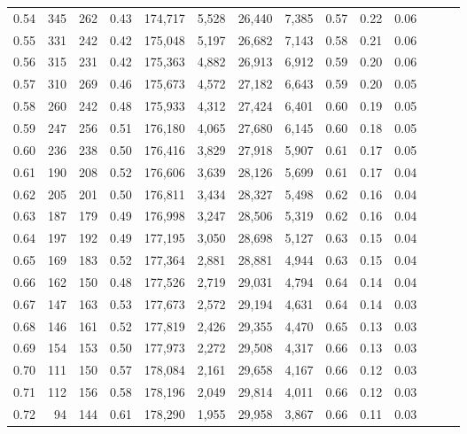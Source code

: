 \begin{tabular}{rrrrrrrrrrrrrr}
0.54 &     345 &  262 &  0.43 &  174,717 &    5,528 &  26,440 &   7,385 &  0.57 &  0.22 &      0.06 \\
0.55 &     331 &  242 &  0.42 &  175,048 &    5,197 &  26,682 &   7,143 &  0.58 &  0.21 &      0.06 \\
0.56 &     315 &  231 &  0.42 &  175,363 &    4,882 &  26,913 &   6,912 &  0.59 &  0.20 &      0.06 \\
0.57 &     310 &  269 &  0.46 &  175,673 &    4,572 &  27,182 &   6,643 &  0.59 &  0.20 &      0.05 \\
0.58 &     260 &  242 &  0.48 &  175,933 &    4,312 &  27,424 &   6,401 &  0.60 &  0.19 &      0.05 \\
0.59 &     247 &  256 &  0.51 &  176,180 &    4,065 &  27,680 &   6,145 &  0.60 &  0.18 &      0.05 \\
0.60 &     236 &  238 &  0.50 &  176,416 &    3,829 &  27,918 &   5,907 &  0.61 &  0.17 &      0.05 \\
0.61 &     190 &  208 &  0.52 &  176,606 &    3,639 &  28,126 &   5,699 &  0.61 &  0.17 &      0.04 \\
0.62 &     205 &  201 &  0.50 &  176,811 &    3,434 &  28,327 &   5,498 &  0.62 &  0.16 &      0.04 \\
0.63 &     187 &  179 &  0.49 &  176,998 &    3,247 &  28,506 &   5,319 &  0.62 &  0.16 &      0.04 \\
0.64 &     197 &  192 &  0.49 &  177,195 &    3,050 &  28,698 &   5,127 &  0.63 &  0.15 &      0.04 \\
0.65 &     169 &  183 &  0.52 &  177,364 &    2,881 &  28,881 &   4,944 &  0.63 &  0.15 &      0.04 \\
0.66 &     162 &  150 &  0.48 &  177,526 &    2,719 &  29,031 &   4,794 &  0.64 &  0.14 &      0.04 \\
0.67 &     147 &  163 &  0.53 &  177,673 &    2,572 &  29,194 &   4,631 &  0.64 &  0.14 &      0.03 \\
0.68 &     146 &  161 &  0.52 &  177,819 &    2,426 &  29,355 &   4,470 &  0.65 &  0.13 &      0.03 \\
0.69 &     154 &  153 &  0.50 &  177,973 &    2,272 &  29,508 &   4,317 &  0.66 &  0.13 &      0.03 \\
0.70 &     111 &  150 &  0.57 &  178,084 &    2,161 &  29,658 &   4,167 &  0.66 &  0.12 &      0.03 \\
0.71 &     112 &  156 &  0.58 &  178,196 &    2,049 &  29,814 &   4,011 &  0.66 &  0.12 &      0.03 \\
0.72 &      94 &  144 &  0.61 &  178,290 &    1,955 &  29,958 &   3,867 &  0.66 &  0.11 &      0.03 \\

\end{tabular}
